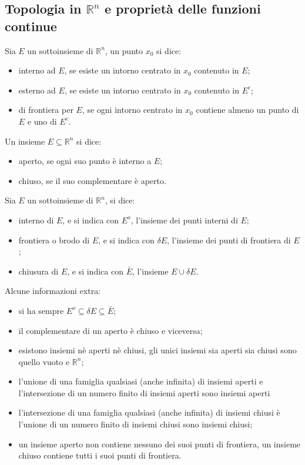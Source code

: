 \subsection*{Topologia in $\mathbb{R}^n$ e proprietà delle funzioni continue}
Sia $E$ un sottoinsieme di $\mathbb{R}^n$, un punto $x_0$ si dice:
\begin{itemize}
    \item interno ad $E$, se esiste un intorno centrato in $x_0$ contenuto in $E$;
    \item esterno ad $E$, se esiste un intorno centrato in $x_0$ contenuto in $E^c$;
    \item di frontiera per $E$, se ogni intorno centrato in $x_0$ contiene almeno un punto di $E$ e uno di $E^c$.
\end{itemize}
Un insieme $E \subseteq \mathbb{R}^n$ si dice:
\begin{itemize}
    \item aperto, se ogni suo punto è interno a $E$;
    \item chiuso, se il suo complementare è aperto.
\end{itemize} 
Sia $E$ un sottoinsieme di $\mathbb{R}^n$, si dice:
\begin{itemize}
    \item interno di $E$, e si indica con $E^o$, l'insieme dei punti interni di $E$;
    \item frontiera o brodo di $E$, e si indica con $\delta E$, l'insieme dei punti di frontiera di $E$;
    \item chiusura di $E$, e si indica con $\bar{E}$, l'insieme $E \cup \delta E$.
\end{itemize}
Alcune informazioni extra: 
\begin{itemize}
    \item si ha sempre $E^o \subseteq \delta E \subseteq \bar{E}$;
    \item il complementare di un aperto è chiuso e viceversa; 
    \item esistono insiemi nè aperti nè chiusi, gli unici insiemi sia aperti sia chiusi sono quello vuoto e $\mathbb{R}^n$;
    \item l'unione di una famiglia qualsiasi (anche infinita) di insiemi aperti e l'intersezione di un numero finito di insiemi aperti sono insiemi aperti 
    \item l'intersezione di una famiglia qualsiasi (anche infinita) di insiemi chiusi è l'unione di un numero finito di insiemi chiusi sono insiemi chiusi;
    \item un insieme aperto non contiene nessuno dei suoi punti di frontiera, un insieme chiuso contiene tutti i suoi punti di frontiera.
\end{itemize}
